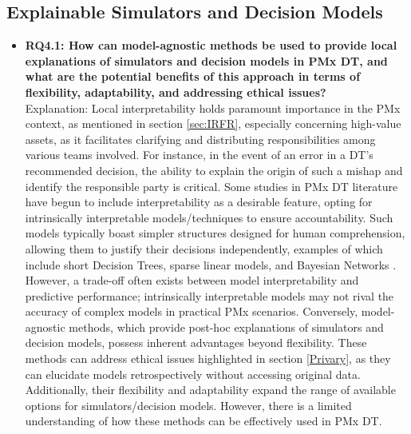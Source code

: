 \documentclass[runningheads]{llncs}
\begin{document}
\subsection{Explainable Simulators and Decision Models}
\begin{itemize}
\item \textbf{RQ4.1: How can model-agnostic methods be used to provide local explanations of simulators and decision models in PMx DT, and what are the potential benefits of this approach in terms of flexibility, adaptability, and addressing ethical issues?} \\
Explanation: Local interpretability holds paramount importance in the PMx context, as mentioned in section \ref{sec:IRFR}, especially concerning high-value assets, as it facilitates clarifying and distributing responsibilities among various teams involved. For instance, in the event of an error in a DT's recommended decision, the ability to explain the origin of such a mishap and identify the responsible party is critical. Some studies in PMx DT literature have begun to include interpretability as a desirable feature, opting for intrinsically interpretable models/techniques to ensure accountability. Such models typically boast simpler structures designed for human comprehension, allowing them to justify their decisions independently, examples of which include short Decision Trees, sparse linear models, and Bayesian Networks \cite{kapteyn2020toward,li2017dynamic,yu2021digital}. However, a trade-off often exists between model interpretability and predictive performance; intrinsically interpretable models may not rival the accuracy of complex models in practical PMx scenarios. Conversely, model-agnostic methods, which provide post-hoc explanations of simulators and decision models, possess inherent advantages beyond flexibility. These methods can address ethical issues highlighted in section \ref{Privary}, as they can elucidate models retrospectively without accessing original data. Additionally, their flexibility and adaptability expand the range of available options for simulators/decision models. However, there is a limited understanding of how these methods can be effectively used in PMx DT.

\end{itemize}
\end{document}
